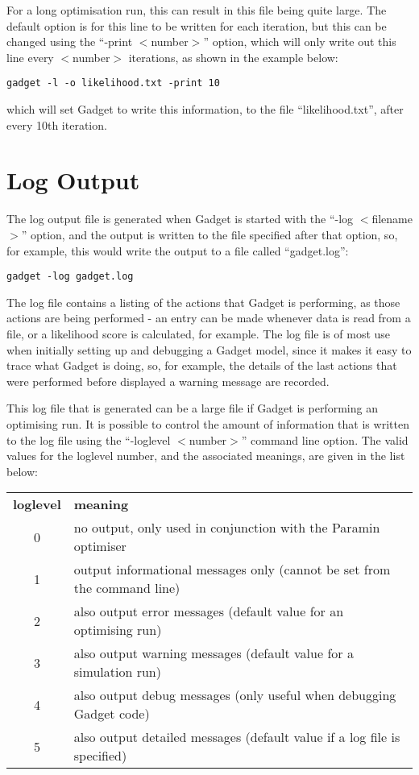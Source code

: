 \documentclass[]{book}
\begin{document}
For a long optimisation run, this can result in this file being quite
large. The default option is for this line to be written for each
iteration, but this can be changed using the ``-print \(<\)number\(>\)''
option, which will only write out this line every \(<\)number\(>\)
iterations, as shown in the example below:

\begin{verbatim}
gadget -l -o likelihood.txt -print 10
\end{verbatim}

which will set Gadget to write this information, to the file
``likelihood.txt'', after every 10th iteration.

\hypertarget{sec:logoutput}{%
\section{Log Output}\label{sec:logoutput}}

The log output file is generated when Gadget is started with the ``-log
\(<\)filename\(>\)'' option, and the output is written to the file specified
after that option, so, for example, this would write the output to a
file called ``gadget.log'':

\begin{verbatim}
gadget -log gadget.log
\end{verbatim}

The log file contains a listing of the actions that Gadget is
performing, as those actions are being performed - an entry can be made
whenever data is read from a file, or a likelihood score is calculated,
for example. The log file is of most use when initially setting up and
debugging a Gadget model, since it makes it easy to trace what Gadget is
doing, so, for example, the details of the last actions that were
performed before displayed a warning message are recorded.

This log file that is generated can be a large file if Gadget is
performing an optimising run. It is possible to control the amount of
information that is written to the log file using the ``-loglevel
\(<\)number\(>\)'' command line option. The valid values for the loglevel
number, and the associated meanings, are given in the list below:

\begin{longtable}[]{@{}cl@{}}
\toprule
\endhead
\textbf{loglevel} & \textbf{meaning}\tabularnewline
0 & no output, only used in conjunction with the Paramin optimiser\tabularnewline
1 & output informational messages only (cannot be set from the command line)\tabularnewline
2 & also output error messages (default value for an optimising run)\tabularnewline
3 & also output warning messages (default value for a simulation run)\tabularnewline
4 & also output debug messages (only useful when debugging Gadget code)\tabularnewline
5 & also output detailed messages (default value if a log file is specified)\tabularnewline
\bottomrule
\end{longtable}
\end{document}
